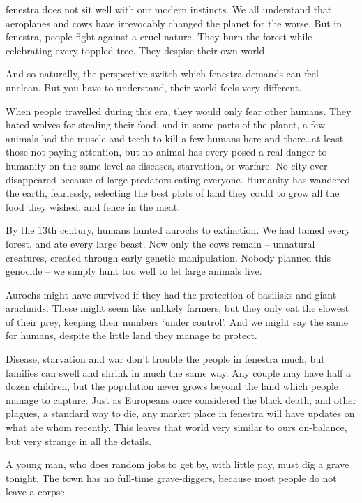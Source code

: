 \begin{multicols}{2}

\noindent
\Gls{fenestra} does not sit well with our modern instincts.
We all understand that aeroplanes and cows have irrevocably changed the planet for the worse.
But in \gls{fenestra}, people fight against a cruel nature.
They burn the forest while celebrating every toppled tree.
They despise their own world.

And so naturally, the perspective-switch which \gls{fenestra} demands can feel unclean.
But you have to understand, their world feels very different.

When people travelled during this era, they would only fear other humans.
They hated wolves for stealing their food, and in some parts of the planet, a few animals had the muscle and teeth to kill a few humans here and there\ldots at least those not paying attention, but no animal has every posed a real danger to humanity on the same level as diseases, starvation, or warfare.
No city ever disappeared because of large predators eating everyone.
Humanity has wandered the earth, fearlessly, selecting the best plots of land they could to grow all the food they wished, and fence in the meat.

By the 13th century, humans hunted aurochs to extinction.
We had tamed every forest, and ate every large beast.
Now only the cows remain -- unnatural creatures, created through early genetic manipulation.
Nobody planned this genocide -- we simply hunt too well to let large animals live.

Aurochs might have survived if they had the protection of basilisks and giant arachnids.
These might seem like unlikely farmers, but they only eat the slowest of their prey, keeping their numbers `under control'.
And we might say the same for humans, despite the little land they manage to protect.

Disease, starvation and war don't trouble the people in \gls{fenestra} much, but families can swell and shrink in much the same way.
Any couple may have half a dozen children, but the population never grows beyond the land which people manage to capture.
Just as Europeans once considered the black death, and other plagues, a standard way to die, any market place in \gls{fenestra} will have updates on what ate whom recently.
This leaves that world very similar to ours on-balance, but very strange in all the details.

\begin{exampletext}
  A young man, who does random jobs to get by, with little pay, must dig a grave tonight.
  The town has no full-time grave-diggers, because most people do not leave a corpse.
\end{exampletext}


\end{multicols}
